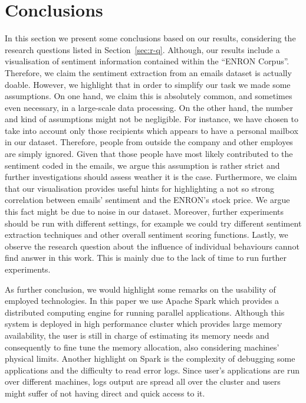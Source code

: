 \documentclass{vldb}
\begin{document}
\section{Conclusions}
\label{sec:concl}
In this section we present some conclusions based on our results, considering the research questions listed in Section~\ref{sec:r-q}.
Although, our results include a visualisation of sentiment information contained within the ``ENRON Corpus''.
Therefore, we claim the sentiment extraction from an emails dataset is actually doable. 
However, we highlight that in order to simplify our task we made some assumptions.
On one hand, we claim this is absolutely common, and sometimes even necessary, in a large-scale data processing.
On the other hand, the number and kind of assumptions might not be negligible.
For instance, we have chosen to take into account only those recipients which appears to have a personal mailbox in our dataset.
Therefore, people from outside the company and other employes are simply ignored.
Given that those people have most likely contributed to the sentiment coded in the emails, we argue this assumption is rather strict and further investigations should assess weather it is the case.  
Furthermore, we claim that our visualisation provides useful hints for highlighting a not so strong correlation between emails' sentiment and the ENRON's stock price.
We argue this fact might be due to noise in our dataset.
Moreover, further experiments should be run with different settings, for example we could try different sentiment extraction techniques and other overall sentiment scoring functions.
Lastly, we observe the research question about the influence of individual behaviours cannot find answer in this work.
This is mainly due to the lack of time to run further experiments.

As further conclusion, we would highlight some remarks on the usability of employed technologies.
In this paper we use Apache Spark which provides a distributed computing engine for running parallel applications.
Although this system is deployed in high performance cluster which provides large memory availability, the user is still in charge of estimating its memory needs and consequently to fine tune the memory allocation, also considering machines' physical limits.
Another highlight on Spark is the complexity of debugging some applications and the difficulty to read error logs.
Since user's applications are run over different machines, logs output are spread all over the cluster and users might suffer of not having direct and quick access to it.
 
\end{document}
